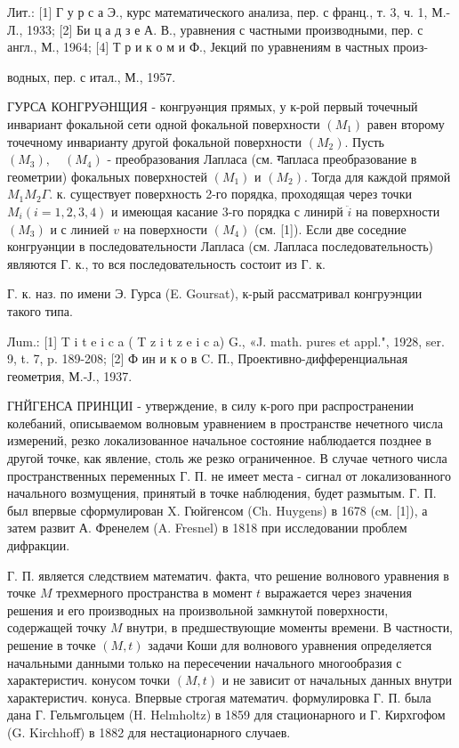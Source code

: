 \documentclass[10pt]{article}
\begin{document}
Лит.: [1] Г у р с а Э., курс математического анализа, пер. с франц., т. 3, ч. 1, М.-Л., 1933; [2] Би ц а д з е А. В., уравнения с частными производными, пер. с англ., М., 1964; [4] Т р и к о м и Ф., Јекций по уравнениям в частных произ-

водных, пер. с итал., М., 1957.



ГУРСА КОНГРУӘНЩИЯ - конгруәнция прямых, у к-рой первый точечный инвариант фокальной сети одной фокальной поверхности $\left(M_{1}\right)$ равен второму точечному инварианту другой фокальной поверхности $\left(M_{2}\right)$. Пусть $\left(M_{3}\right), \quad\left(M_{4}\right)$ - преобразования Лапласа (см. गапласа преобразование в геометрии) фокальных поверхностей $\left(M_{1}\right)$ и $\left(M_{2}\right)$. Тогда для каждой прямой $M_{1} M_{2} \Gamma$. к. существует поверхность 2-го порядка, проходящая через точки $M_{i}(i=1,2,3,4)$ и имеющая касание 3-го порядка с линирй $\ddot{i}$ на поверхности $\left(M_{3}\right)$ и с линией $v$ на поверхности $\left(M_{4}\right)$ (см. [1]). Если две соседние конгруәнции в последовательности Лапласа (см. Лапласа последовательность) являются Г. к., то вся последовательность состоит из Г. к.



Г. к. наз. по имени Э. Гурса (E. Goursat), к-рый рассматривал конгруэнции такого типа.



Лum.: [1] T i t e i c a ( T z i t z e i c a) G., «J. math. pures et appl.", 1928, ser. 9, t. 7, p. 189-208; [2] Ф ин и к о в C. П., Проективно-дифференциальная геометрия, М.-Ј., 1937.



ГНЙГЕНСА ПРИНЦИІ - утверждение, в силу к-рого при распространении колебаний, описываемом волновым уравнением в пространстве нечетного числа измерений, резко локализованное начальное состояние наблюдается позднее в другой точке, как явление, столь же резко ограниченное. В случае четного числа пространственных переменных Г. П. не имеет места - сигнал от локализованного начального возмущения, принятый в точке наблюдения, будет размытым. Г. П. был впервые сформулирован $\mathrm{X}$. Гюйгенсом (Ch. Huygens) в 1678 (cм. [1]), а затем развит А. Френелем (A. Fresnel) в 1818 при исследовании проблем дифракции.



Г. П. является следствием математич. факта, что решение волнового уравнения в точке $M$ трехмерного пространства в момент $t$ выражается через значения решения и его производных на произвольной замкнутой поверхности, содержащей точку $M$ внутри, в предшествующие моменты времени. В частности, решение в точке $(M, t)$ задачи Коши для волнового уравнения определяется начальными данными только на пересечении начального многообразия с характеристич. конусом точки $(M, t)$ и не зависит от начальных данных внутри характеристич. конуса. Впервые строгая математич. формулировка Г. П. была дана Г. Гельмгольцем (H. Helmholtz) в 1859 для стационарного и Г. Кирхгофом (G. Kirchhoff) в 1882 для нестационарного случаев.
\end{document}
